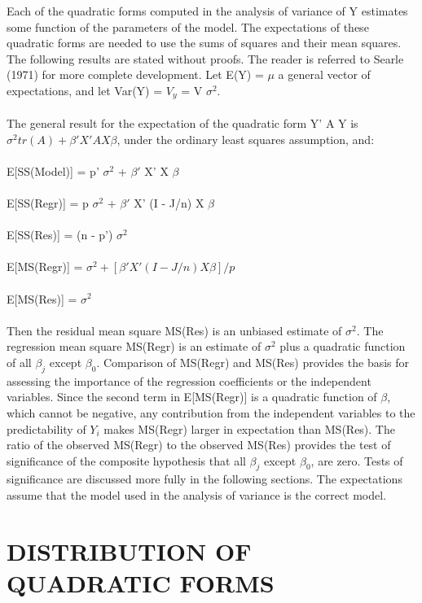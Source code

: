 \documentclass[letterpaper,11pt]{article}
\begin{document}
{Each of the quadratic forms computed in the analysis of variance of Y estimates some function of the parameters of the model. The 
expectations of these quadratic forms are needed to use the sums of squares and their mean squares. The following 
results are stated without proofs. The reader is referred to Searle (1971) for more complete development.
Let E(Y) = $\mu$ a general vector of expectations, and let Var(Y) = $V_{y}$ = V $\sigma^{2}$.
\\ \\
The general result for the expectation of the quadratic form Y' A Y is $\sigma^{2} tr(A) + \beta' X' A X \beta$, under the ordinary least squares assumption, and:
\\ \\
E[SS(Model)] = p' $\sigma^{2}$ + $\beta'$ X' X $\beta$
\\ \\
E[SS(Regr)] = p $\sigma^{2}$ + $\beta'$ X' (I - J/n) X $\beta$
\\ \\
E[SS(Res)] = (n - p') $\sigma^{2}$
\\ \\
E[MS(Regr)] = $\sigma^{2} + [\beta' X' (I - J/n) X \beta]/p$
\\ \\
E[MS(Res)] = $\sigma^{2}$
\\ \\
Then the residual mean square MS(Res) is an unbiased estimate of $\sigma^{2}$. The regression mean square MS(Regr) is an estimate of $\sigma^
{2}$ plus a quadratic function of all $\beta_{j}$ except $\beta_{0}$. Comparison of MS(Regr) and MS(Res) provides the basis for 
assessing the importance of the regression coefficients or the independent variables. Since the second term in E[MS(Regr)] 
is a quadratic function of $\beta$, which cannot be negative, any contribution from the independent variables to the predictability of $Y_{i
}$ makes MS(Regr) larger in expectation than MS(Res). The ratio of the observed MS(Regr) to the observed MS(Res) provides the test of 
significance of the composite hypothesis that all $\beta_{j}$ except $\beta_{0}$, are zero. Tests of significance are discussed more fully 
in the following sections. The expectations assume that the model used in the analysis of variance is the correct model.

\section{DISTRIBUTION OF QUADRATIC FORMS}

}
\end{document}
